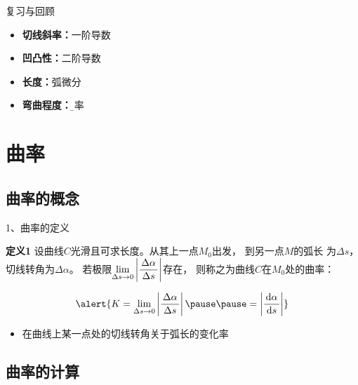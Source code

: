 \begin{frame}{复习与回顾}
	\linespread{1.5}
% 	
	
	\begin{itemize}
	  \item {\bf 切线斜率：}一阶导数
	  \item {\bf 凹凸性：}二阶导数
	  \item {\bf 长度：}弧微分\pause
	  \item {\bf 弯曲程度：}{\b 曲率}
	\end{itemize}
\end{frame}

\section{曲率}

\subsection{曲率的概念}



\begin{frame}{1、曲率的定义}
	\linespread{1.5}
	\pause
	\begin{block}{{\bf 定义1}\hfill }
		设曲线$C$光滑且可求长度。\pause 从其上一点$M_0$出发，
		到另一点$M$的弧长
		为$\Delta s$，切线转角为$\Delta\alpha$。
		\pause 若极限$\lim\limits_{\Delta s\to
		0}\left|\displaystyle\frac{\,{\Delta\alpha}\,}{\,{\Delta s}\,}\right|$存在，
		则称之为{\bb 曲线$C$在$M_0$处的曲率：}
		
		\pause\vspace{-1em}
	$$\alert{K=\lim\limits_{\Delta s\to
				0}\left|\df{\Delta\alpha}{\Delta s}\right|\pause\pause
				=\left|\df{\d\alpha}{\d s}\right|}$$ 
	\end{block}\vspace{-1ex}
	\begin{itemize}
	  \item \alert{在曲线上某一点处的切线转角关于弧长的变化率}
	\end{itemize}
\end{frame}

\subsection{曲率的计算}

